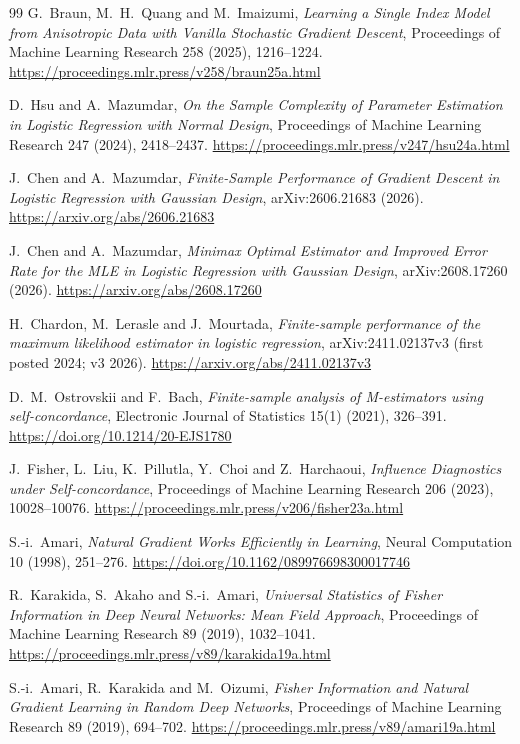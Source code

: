 \documentclass[11pt]{article}
\begin{document}
\begin{thebibliography}{99}
G.~Braun, M.~H.~Quang and M.~Imaizumi,
\emph{Learning a Single Index Model from Anisotropic Data with Vanilla Stochastic Gradient Descent},
Proceedings of Machine Learning Research 258 (2025), 1216--1224.
\url{https://proceedings.mlr.press/v258/braun25a.html}

D.~Hsu and A.~Mazumdar,
\emph{On the Sample Complexity of Parameter Estimation in Logistic Regression with Normal Design},
Proceedings of Machine Learning Research 247 (2024), 2418--2437.
\url{https://proceedings.mlr.press/v247/hsu24a.html}

J.~Chen and A.~Mazumdar,
\emph{Finite-Sample Performance of Gradient Descent in Logistic Regression with Gaussian Design},
arXiv:2606.21683 (2026).
\url{https://arxiv.org/abs/2606.21683}

J.~Chen and A.~Mazumdar,
\emph{Minimax Optimal Estimator and Improved Error Rate for the MLE in Logistic Regression with Gaussian Design},
arXiv:2608.17260 (2026).
\url{https://arxiv.org/abs/2608.17260}

H.~Chardon, M.~Lerasle and J.~Mourtada,
\emph{Finite-sample performance of the maximum likelihood estimator in logistic regression},
arXiv:2411.02137v3 (first posted 2024; v3 2026).
\url{https://arxiv.org/abs/2411.02137v3}

D.~M.~Ostrovskii and F.~Bach,
\emph{Finite-sample analysis of M-estimators using self-concordance},
Electronic Journal of Statistics 15(1) (2021), 326--391.
\url{https://doi.org/10.1214/20-EJS1780}

J.~Fisher, L.~Liu, K.~Pillutla, Y.~Choi and Z.~Harchaoui,
\emph{Influence Diagnostics under Self-concordance},
Proceedings of Machine Learning Research 206 (2023), 10028--10076.
\url{https://proceedings.mlr.press/v206/fisher23a.html}

S.-i.~Amari,
\emph{Natural Gradient Works Efficiently in Learning},
Neural Computation 10 (1998), 251--276.
\url{https://doi.org/10.1162/089976698300017746}

R.~Karakida, S.~Akaho and S.-i.~Amari,
\emph{Universal Statistics of Fisher Information in Deep Neural Networks: Mean Field Approach},
Proceedings of Machine Learning Research 89 (2019), 1032--1041.
\url{https://proceedings.mlr.press/v89/karakida19a.html}

S.-i.~Amari, R.~Karakida and M.~Oizumi,
\emph{Fisher Information and Natural Gradient Learning in Random Deep Networks},
Proceedings of Machine Learning Research 89 (2019), 694--702.
\url{https://proceedings.mlr.press/v89/amari19a.html}


\end{thebibliography}
\end{document}
